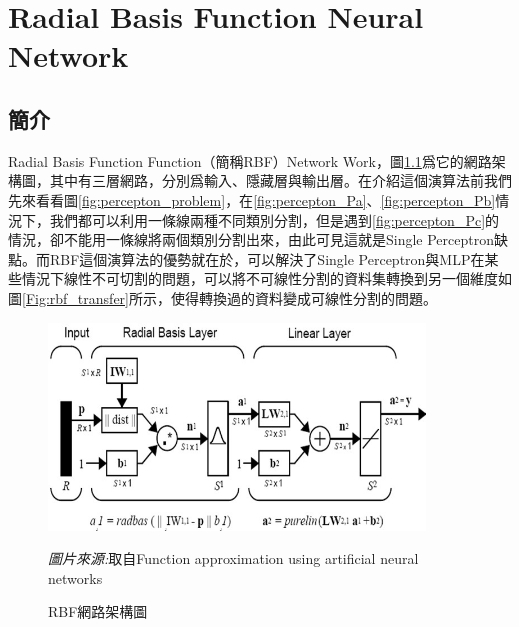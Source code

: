 \chapter{Radial Basis Function Neural Network}
\label{chapter:rbf}
\section{簡介}
\label{sec:rbf_introduction}
Radial Basis Function Function（簡稱RBF）Network Work，圖\ref{fig:rbf_network}爲它的網路架構圖，其中有三層網路，分別爲輸入、隱藏層與輸出層。在介紹這個演算法前我們先來看看圖\ref{fig:percepton_problem}，在\ref{fig:percepton_Pa}、\ref{fig:percepton_Pb}情況下，我們都可以利用一條線兩種不同類別分割，但是遇到\ref{fig:percepton_Pc}的情況，卻不能用一條線將兩個類別分割出來，由此可見這就是Single Perceptron缺點。而RBF這個演算法的優勢就在於，可以解決了Single Perceptron與MLP在某些情況下線性不可切割的問題，可以將不可線性分割的資料集轉換到另一個維度如圖\ref{Fig:rbf_transfer}所示，使得轉換過的資料變成可線性分割的問題。
\begin{figure}[htbp]
	\centering
	\centerline{\includegraphics[width=10cm]{pic/rbf_struct.png}}
	\caption{RBF網路架構圖}
	\begin{minipage}{.7\linewidth}
		\footnotesize
		\emph{圖片來源:}取自Function approximation using artificial neural networks
	\end{minipage}
	\label{fig:rbf_network}
\end{figure}

